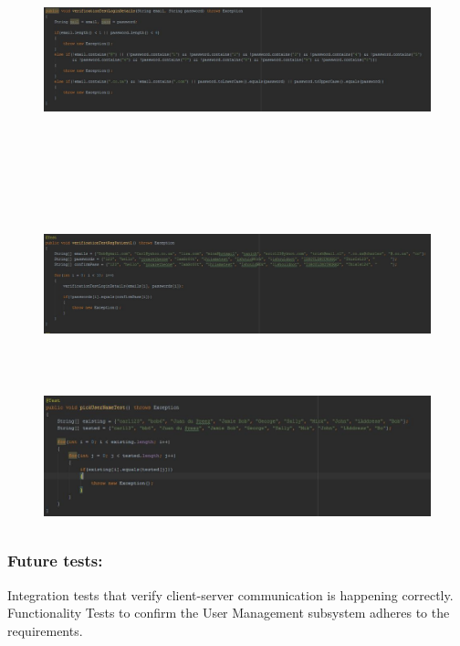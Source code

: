 \documentclass[12pt]{article}
\begin{document}
{\begin{center}
	\begin{figure}[h]
		\includegraphics[width=15cm, height=7cm]{tests/usrUI/TestLoginFunction.JPG}
	\end{figure}

	\begin{figure}[h]
		\includegraphics[width=15cm, height=5cm]{tests/usrUI/TestRegister.JPG}
	\end{figure}

	\begin{figure}[h]
		\includegraphics[width=15cm, height=4cm]{tests/usrUI/TestUsername.JPG}
	\end{figure}
	\end{center}

	\subsubsection{Future tests:}
	Integration tests that verify client-server communication is happening correctly. Functionality Tests to confirm the User Management subsystem adheres to the requirements. 

}
\end{document}
